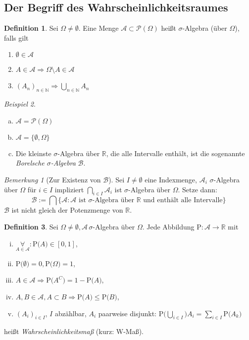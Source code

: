 \documentclass[a4paper,12pt,fleqn]{scrartcl}
\newcommand{\N}{\mathbb{N}}
\newcommand{\R}{\mathbb{R}}
\newcommand{\m}[1]{\mathcal{ #1 }}
\newcommand{\prob}[1]{\text{P(} #1 \text{)}}
\newcommand{\impl}{\Rightarrow}
\newcommand{\fa}[1]{\mathop{\forall}\limits_{#1}}
\theoremstyle{definition}
\newtheorem{definition}{Definition}[section]
\theoremstyle{plain}
\theoremstyle{remark}
\newtheorem*{bemerkung}{Bemerkung}
\newtheorem{beispiel}[definition]{Beispiel}
\begin{document}
\subsection{Der Begriff des Wahrscheinlichkeitsraumes}
\begin{definition}
Sei $\Omega\neq\emptyset$. Eine Menge $\m{A}\subset\m{P}(\Omega)$  heißt $\sigma$-Algebra (über $\Omega$), falls gilt
\begin{enumerate}
\item $\emptyset\in\m{A}$
\item $A\in\m{A}\impl \Omega\setminus A\in\m{A}$
\item $(A_n)_{n\in\N}\impl\bigcup_{n\in\N}A_n$
\end{enumerate}
\end{definition}
\begin{beispiel}
\begin{enumerate}[a)]
\item $\m{A}=\m{P}(\Omega)$
\item $\m{A}=\{\emptyset,\Omega\}$
\item Die kleinste $\sigma$-Algebra über $\R$, die alle Intervalle enthält, ist die sogenannte \emph{Borelsche $\sigma$-Algebra} $\m{B}$.
\end{enumerate}
\end{beispiel}
\begin{bemerkung}[Zur Existenz von $\m{B}$]
Sei $I\neq\emptyset$ eine Indexmenge, $\m{A}_i$ $\sigma$-Algebra über $\Omega$ für $i\in I$ impliziert $\bigcap_{i\in I}\m{A}_i$ ist $\sigma$-Algebra über $\Omega$. Setze dann:
\[\m{B}:=\bigcap\{\m{A} : \m{A}\text{ ist }\sigma\text{-Algebra über }\R\text{ und enthält alle Intervalle}\}\]
$\m{B}$ ist nicht gleich der Potenzmenge von $\R$.
\end{bemerkung}
\begin{definition}
Sei $\Omega\neq\emptyset,\m{A} \, \sigma$-Algebra über $\Omega$. Jede Abbildung $\text{P}:\m{A}\to\R$ mit
\begin{enumerate}[i.]
\item $\fa{A\in\m{A}}:\prob{A}\in\left[ 0,1\right]$,
\item $\prob{\emptyset}=0,\prob{\Omega}=1$,
\item $A\in\m{A}\impl \prob{A^C}=1-\prob{A}$,
\item $A,B\in\m{A},A\subset B\impl \prob{A}\leq \prob{B}$,
\item $(A_i)_{i\in I}$, $I$ abzählbar, $A_i$ paarweise disjunkt: $\prob{\bigcup_{i\in I}} A_i=\sum_{i\in I}\prob{A_k}$
\end{enumerate}
heißt \emph{Wahrscheinlichkeitsmaß} (kurz: W-Maß).
\end{definition}
\end{document}
